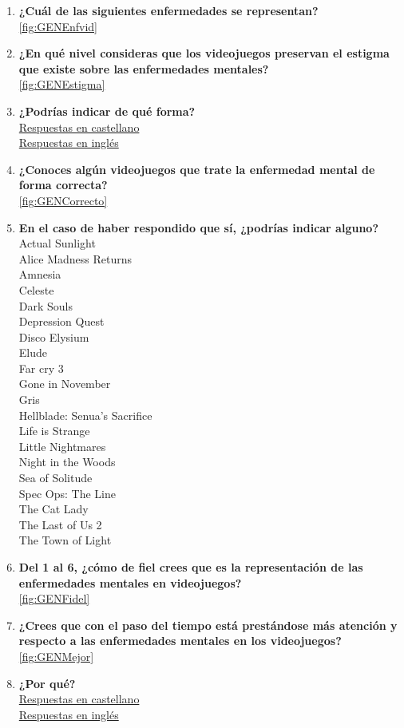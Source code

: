 \documentclass[12pt, a4paper,twoside,titlepage]{book}
\begin{document}
\begin{enumerate}[label=\textbf{\arabic*}.]
     \item \textbf{¿Cuál de las siguientes enfermedades se representan? }\\
     \ref{fig:GENEnfvid}
     \item \textbf{¿En qué nivel consideras que los videojuegos preservan el estigma que existe sobre las enfermedades mentales?}\\
     \ref{fig:GENEstigma}
     \item \textbf{¿Podrías indicar de qué forma?}\\
      \hyperref[estigmaCastellano]{Respuestas en castellano}\\
     \hyperref[estigmaIngles]{Respuestas en inglés}
     \item \textbf{¿Conoces algún videojuegos que trate la enfermedad mental de forma correcta? }\\
     \ref{fig:GENCorrecto}
     \item \textbf{En el caso de haber respondido que sí, ¿podrías indicar alguno?}
     \label{listadoVidCorr}
    Actual Sunlight \\
    Alice Madness Returns\\
    Amnesia\\
    Celeste\\
    Dark Souls\\
    Depression Quest \\
    Disco Elysium\\
    Elude\\
    Far cry 3\\
    Gone in November\\
    Gris\\
    Hellblade: Senua’s Sacrifice\\
    Life is Strange\\
    Little Nightmares\\
    Night in the Woods\\
    Sea of Solitude\\
    Spec Ops: The Line\\
    The Cat Lady\\
    The Last of Us 2\\
    The Town of Light\\

     \item \textbf{Del 1 al 6, ¿cómo de fiel crees que es la representación de las enfermedades mentales en videojuegos?}\\
     \ref{fig:GENFidel}
     \item \textbf{¿Crees que con el paso del tiempo está prestándose más atención y respecto a las enfermedades mentales en los videojuegos?}\\
     \ref{fig:GENMejor}
     \item \textbf{¿Por qué? }\\
     \hyperref[mejorCastellano]{Respuestas en castellano}\\
     \hyperref[mejorIngles]{Respuestas en inglés}
\end{enumerate}
\end{document}
